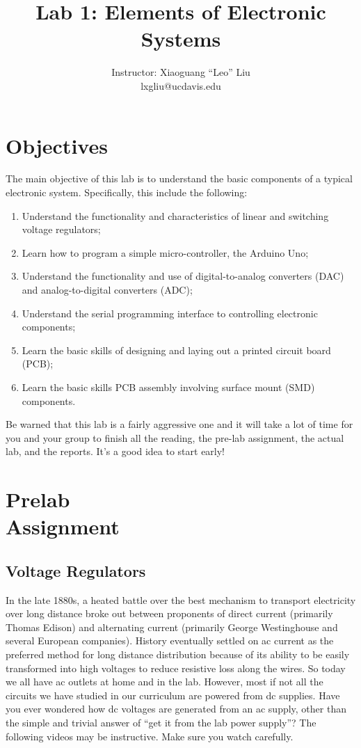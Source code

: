 \documentclass[letterpaper, 11pt]{article}
\begin{document}
\title{Lab 1: Elements of Electronic Systems}
\author{Instructor: Xiaoguang ``Leo'' Liu\\lxgliu@ucdavis.edu}
\date{}

\maketitle

\section{Objectives}
The main objective of this lab is to understand the basic components of a typical electronic system. Specifically, this include the following:
\begin{enumerate}
\item Understand the functionality and characteristics of linear and switching voltage regulators;
\item Learn how to program a simple micro-controller, the Arduino Uno;
\item Understand the functionality and use of digital-to-analog converters (DAC) and analog-to-digital converters (ADC);
\item Understand the serial programming interface to controlling electronic components;
\item Learn the basic skills of designing and laying out a printed circuit board (PCB);
\item Learn the basic skills PCB assembly involving surface mount (SMD) components.
\end{enumerate}

Be warned that this lab is a fairly aggressive one and it will take a lot of time for you and your group to finish all the reading, the pre-lab assignment, the actual lab, and the reports. It's a good idea to start early!

\section{Prelab \\Assignment}

\subsection{Voltage Regulators}
In the late 1880s, a heated battle over the best mechanism to transport electricity over long distance broke out between proponents of direct current (primarily Thomas Edison) and alternating current (primarily George Westinghouse and several European companies). History eventually settled on ac current as the preferred method for long distance distribution because of its ability to be easily transformed into high voltages to reduce resistive loss along the wires. So today we all have ac outlets at home and in the lab. However, most if not all the circuits we have studied in our curriculum are powered from dc supplies. Have you ever wondered how dc voltages are generated from an ac supply, other than the simple and trivial answer of ``get it from the lab power supply''? The following videos may be instructive. Make sure you watch carefully. 
\end{document}
